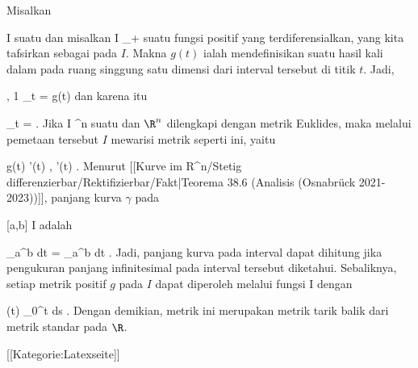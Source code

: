 {

Misalkan

\mavergleichskette
{\vergleichskette
{ I
}
{ \subseteq }{ \R
}
{  }{
}
{    }{
}
{   }{
}
}
{}{}{}
suatu
dan misalkan
 { I } {\R_+
} {}
suatu fungsi positif yang terdiferensialkan, yang kita tafsirkan sebagai
pada $I$. Makna $g(t)$ ialah mendefinisikan suatu hasil kali dalam pada ruang singgung satu dimensi dari interval tersebut di titik $t$. Jadi,

\mavergleichskettedisp
{\vergleichskette
{ \left{}  ,  1  \right\rangle_t
}
{ =} { g(t)
}
{ } {
}
{ } {
}
{ } {
}
}
{}{}{}
dan karena itu

\mavergleichskettedisp
{\vergleichskette
{  \Vert_t
}
{ =} { 
}
{ } {
}
{ } {
}
{ } {
}
}
{}{}{.}
Jika
\maabb {\gamma} { I } { \R^n
} {}
suatu
dan $\R^n$ dilengkapi dengan metrik Euklides, maka melalui pemetaan tersebut $I$ mewarisi metrik seperti ini, yaitu

\mavergleichskettedisp
{\vergleichskette
{ g(t)
}
{ } { \left\langle  \gamma'(t) ,  \gamma'(t)  \right\rangle
}
{ } {
}
{ } {
}
{ } {
}
}
{}{}{.}
Menurut
[[Kurve im R^n/Stetig differenzierbar/Rektifizierbar/Fakt|Teorema 38.6 (Analisis (Osnabrück 2021-2023))]],
panjang kurva $\gamma$ pada

\mavergleichskette
{\vergleichskette
{ [a,b]
}
{ \subseteq }{ I
}
{  }{
}
{    }{
}
{   }{
}
}
{}{}{}
adalah

\mavergleichskettedisp
{\vergleichskette
{ \int_a^b  \Vert  dt
}
{ =} { \int_a^b    dt
}
{ } {
}
{ } {
}
{ } {
}
}
{}{}{.}
Jadi, panjang kurva pada interval dapat dihitung jika pengukuran panjang infinitesimal pada interval tersebut diketahui. Sebaliknya, setiap metrik positif $g$ pada $I$ dapat diperoleh melalui fungsi
\maabbdisp {\gamma} { I } { \R
} {}
dengan

\mavergleichskettedisp
{\vergleichskette
{ \gamma(t)
}
{ } { \int_0^t  ds
}
{ } {
}
{ } {
}
{ } {
}
}
{}{}{.}
Dengan demikian, metrik ini merupakan metrik tarik balik dari metrik standar pada $\R$.

}

 [[Kategorie:Latexseite]]
